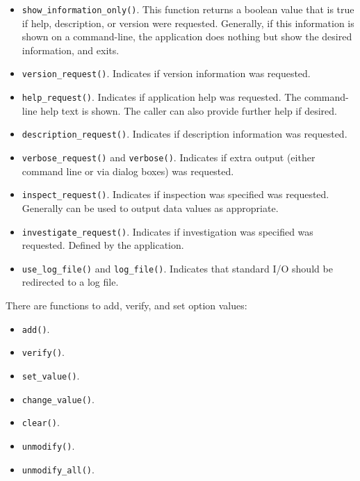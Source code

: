    \begin{itemize}
      \item \texttt{show\_information\_only()}.
         This function returns a boolean value that is true if
         help, description, or version were requested.
         Generally, if this information is shown on a command-line,
         the application does
         nothing but show the desired information, and exits.
      \item \texttt{version\_request()}.
         Indicates if version information was requested.
      \item \texttt{help\_request()}.
         Indicates if application help was requested.
         The command-line help text is shown.
         The caller can also provide further help if desired.
      \item \texttt{description\_request()}.
         Indicates if description information was requested.
      \item \texttt{verbose\_request()} and \texttt{verbose()}.
         Indicates if extra output (either command line or via
         dialog boxes) was requested.
      \item \texttt{inspect\_request()}.
         Indicates if inspection was specified was requested.
         Generally can be used to output data values as appropriate.
      \item \texttt{investigate\_request()}.
         Indicates if investigation was specified was requested.
         Defined by the application.
      \item \texttt{use\_log\_file()} and \texttt{log\_file()}.
         Indicates that standard I/O should be redirected to a log file.
   \end{itemize}

   There are functions to add, verify, and set option values:

   \begin{itemize}
      \item \texttt{add()}.
      \item \texttt{verify()}.
      \item \texttt{set\_value()}.
      \item \texttt{change\_value()}.
      \item \texttt{clear()}.
      \item \texttt{unmodify()}.
      \item \texttt{unmodify\_all()}.
   \end{itemize}

